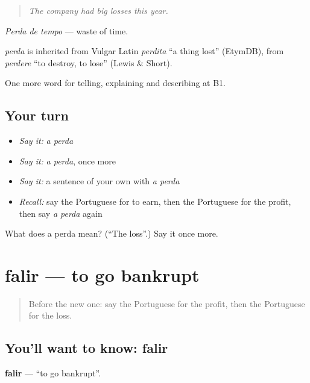 \begin{quote}
\emph{The company had big losses this year.}
\end{quote}

\emph{Perda de tempo} — waste of time.

\begin{cousinweb}
\emph{perda} is inherited from Vulgar Latin \emph{perdita} \textquotedblleft{}a thing lost\textquotedblright{} (EtymDB), from \emph{perdere} \textquotedblleft{}to destroy, to lose\textquotedblright{} (Lewis \& Short).
\end{cousinweb}

\begin{grammarlens}[title={What you've built}]
One more word for telling, explaining and describing at B1.
\end{grammarlens}

\subsection*{Your turn}
\begin{itemize}
\raggedright
  \item \emph{Say it:} \emph{a perda}
  \item \emph{Say it:} \emph{a perda}, once more
  \item \emph{Say it:} a sentence of your own with \emph{a perda}
  \item \emph{Recall:} say the Portuguese for to earn, then the Portuguese for the profit, then say \emph{a perda} again
\end{itemize}

\begin{tcolorbox}[breakable,colback=teal!4,colframe=teal!35!black,title={Before you move on}]
What does a perda mean? (\textquotedblleft{}The loss\textquotedblright{}.) Say it once more.
\end{tcolorbox}
\section[falir]{falir — to go bankrupt}

\label{lesson:PT-C395-falir}



\begin{quote}
Before the new one: say the Portuguese for the profit, then the Portuguese for the loss.
\end{quote}

\subsection*{You'll want to know: falir}
\textbf{falir} — \textquotedblleft{}to go bankrupt\textquotedblright{}.

